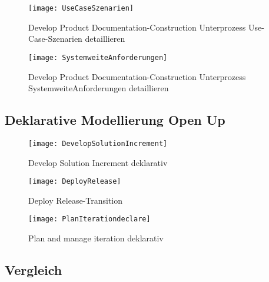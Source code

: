 \begin{figure}[!htbp]
\begin{center}
  \texttt{[image: UseCaseSzenarien]} %
  \caption{Develop Product Documentation-Construction Unterprozess Use-Case-Szenarien detaillieren}
  \label{fig:UseCaseSzenarien}
\end{center}
\end{figure}

\begin{figure}[!htbp]
\begin{center}
  \texttt{[image: SystemweiteAnforderungen]} %
  \caption{Develop Product Documentation-Construction Unterprozess SystemweiteAnforderungen detaillieren}
  \label{fig:SystemweiteAnforderungen}
\end{center}
\end{figure}



\subsection{Deklarative Modellierung Open Up}


\begin{figure}[htp]
\begin{center}
  \texttt{[image: DevelopSolutionIncrement]} %
  \caption{Develop Solution Increment deklarativ}
  \label{fig:Develop}
\end{center}
\end{figure}




\begin{figure}[htp]
\begin{center}
  \texttt{[image: DeployRelease]} %
  \caption{Deploy Release-Transition}
  \label{fig:DeployRelease}
\end{center}
\end{figure}


\begin{figure}[htp]
\begin{center}
  \texttt{[image: PlanIterationdeclare]} %
  \caption{Plan and manage iteration deklarativ}
  \label{fig:PlanIterationdeclare}
\end{center}
\end{figure}
\subsection{Vergleich}







